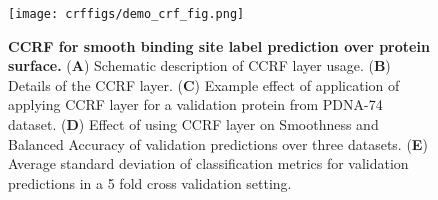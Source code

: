 \begin{center}
\begin{figure}[!htp]
                \texttt{[image: crffigs/demo\_crf\_fig.png]}
        \caption[CCRF for smooth binding site label prediction over protein surface.]{\textbf{CCRF
        for smooth binding site label prediction over protein surface.} ({\bf A}) Schematic
        description of CCRF layer usage. ({\bf B}) Details of the CCRF layer. ({\bf C}) Example
        effect of application of applying CCRF layer for a validation protein from PDNA-74 dataset.
        ({\bf D}) Effect of using CCRF layer on Smoothness and Balanced Accuracy of validation
        predictions over three datasets. ({\bf E}) Average standard deviation of classification
        metrics for validation predictions in a 5 fold cross validation setting.}
        \label{fig:ccrf} \end{figure} \end{center}

